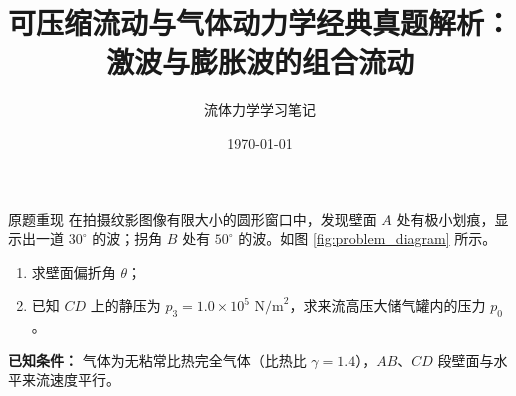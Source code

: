 \documentclass[a4paper,11pt]{article}
\begin{document}
\title{\textbf{\Large 可压缩流动与气体动力学经典真题解析：\\ 激波与膨胀波的组合流动}}
\author{流体力学学习笔记}
\date{\today}
\maketitle

\thispagestyle{plain}

\begin{problembox}{原题重现}
在拍摄纹影图像有限大小的圆形窗口中，发现壁面 $A$ 处有极小划痕，显示出一道 $30^\circ$ 的波；拐角 $B$ 处有 $50^\circ$ 的波。如图 \ref{fig:problem_diagram} 所示。
\begin{enumerate}
    \item 求壁面偏折角 $\theta$；
    \item 已知 $CD$ 上的静压为 $p_3 = 1.0 \times 10^5 \text{ N/m}^2$，求来流高压大储气罐内的压力 $p_0$。
\end{enumerate}
\textbf{已知条件：} 气体为无粘常比热完全气体（比热比 $\gamma = 1.4$），$AB$、$CD$ 段壁面与水平来流速度平行。
\end{problembox}
\end{document}
